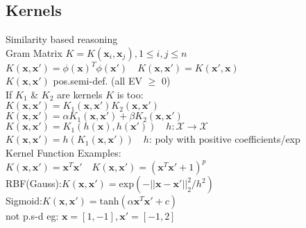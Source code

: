 \subsection*{Kernels}
Similarity based reasoning\\
Gram Matrix $K{=}K(\mathbf{x}_i, \mathbf{x}_j), 1{\leq} i,j{\leq} n$\\
$K(\mathbf{x}, \mathbf{x'}) {=} \phi(\mathbf{x})^T\phi(\mathbf{x'})\quad K(\mathbf{x},\mathbf{x'}){=}K(\mathbf{x'},\mathbf{x})$\\
$K(\mathbf{x},\mathbf{x'})$ pos.semi-def. (all EV $\geq$ 0)\\
If $K_1$ \& $K_2$ are kernels $K$ is too:\\
$K(\mathbf{x}, \mathbf{x'})=K_1(\mathbf{x}, \mathbf{x'})K_2(\mathbf{x}, \mathbf{x'})$\\
$K(\mathbf{x},\mathbf{x'})=\alpha K_1(\mathbf{x}, \mathbf{x'})+\beta K_2(\mathbf{x}, \mathbf{x'})$\\
$K(\mathbf{x},\mathbf{x'}){=}K_1(h(\mathbf{x}), h(\mathbf{x'}))\quad h:\mathcal{X}{\rightarrow}\mathcal{X}$\\
$K(\mathbf{x},\mathbf{x'}){=}h(K_1(\mathbf{x}, \mathbf{x'}))\quad h$: poly with positive coefficients/exp\\
Kernel Function Examples:\\
$K(\mathbf{x},\mathbf{x'}){=}\mathbf{x}^T\mathbf{x'}\quad K(\mathbf{x},\mathbf{x'}){=}(\mathbf{x}^T\mathbf{x'}{+}1)^p$\\
RBF(Gauss):$K(\mathbf{x},\mathbf{x'}){=}\mathrm{exp}(-||\mathbf{x}{-}\mathbf{x'}||_2^2/h^2)$\\
Sigmoid:$K(\mathbf{x},\mathbf{x'}){=}\mathrm{tanh}(\alpha\mathbf{x}^T\mathbf{x'}+c)$\\
not p.s-d eg: $\mathbf{x}{=}[1,-1], \mathbf{x'}{=}[-1,2]$